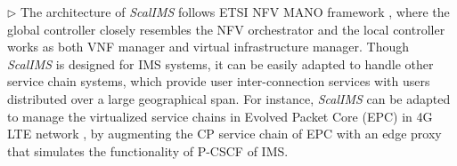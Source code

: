 
$\triangleright$ The architecture of \textit{ScalIMS} follows ETSI NFV MANO framework \cite{nfvmano}, where the global controller closely resembles the NFV orchestrator and the local controller works as both VNF manager and virtual infrastructure manager. Though \textit{ScalIMS} is designed for IMS systems, it can be easily adapted to handle other service chain systems, which provide user inter-connection services with users distributed over a large geographical span. For instance, \textit{ScalIMS} can be adapted to manage the virtualized service chains in Evolved Packet Core (EPC) in 4G LTE network \cite{epc}, by augmenting the CP service chain of EPC with an edge proxy that simulates the functionality of P-CSCF of IMS.

